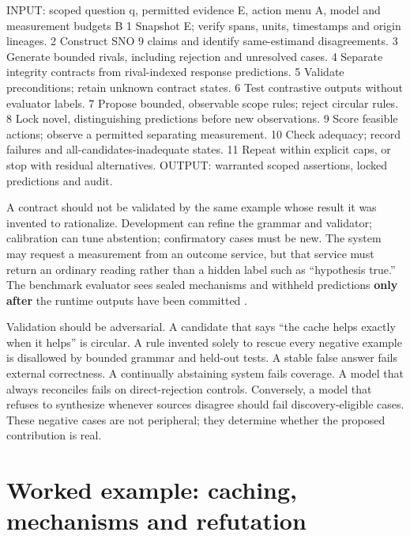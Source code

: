 \documentclass[11pt,a4paper]{article}
\begin{document}
\par\medskip
\noindent\begin{minipage}{\linewidth}
\begin{CNSAlgorithm}
INPUT: scoped question q, permitted evidence E, action menu A,
       model and measurement budgets B
1  Snapshot E; verify spans, units, timestamps and origin lineages.
2  Construct SNO 9 claims and identify same-estimand disagreements.
3  Generate bounded rivals, including rejection and unresolved cases.
4  Separate integrity contracts from rival-indexed response predictions.
5  Validate preconditions; retain unknown contract states.
6  Test contrastive outputs without evaluator labels.
7  Propose bounded, observable scope rules; reject circular rules.
8  Lock novel, distinguishing predictions before new observations.
9  Score feasible actions; observe a permitted separating measurement.
10 Check adequacy; record failures and all-candidates-inadequate states.
11 Repeat within explicit caps, or stop with residual alternatives.
OUTPUT: warranted scoped assertions, locked predictions and audit.
\end{CNSAlgorithm}
\end{minipage}\par\medskip

A contract should not be validated by the same example whose result it
was invented to rationalize. Development can refine the grammar and
validator; calibration can tune abstention; confirmatory cases must be
new. The system may request a measurement from an outcome service, but
that service must return an ordinary reading rather than a hidden label
such as ``hypothesis true.'' The benchmark evaluator sees sealed
mechanisms and withheld predictions \textbf{only after} the runtime
outputs have been committed \citep{G08}.

Validation should be adversarial. A candidate that says ``the cache
helps exactly when it helps'' is circular. A rule invented solely to
rescue every negative example is disallowed by bounded grammar and
held-out tests. A stable false answer fails external correctness. A
continually abstaining system fails coverage. A model that always
reconciles fails on direct-rejection controls. Conversely, a model that
refuses to synthesize whenever sources disagree should fail
discovery-eligible cases. These negative cases are not peripheral; they
determine whether the proposed contribution is real.

\section{Worked example: caching, mechanisms and
refutation}\label{worked-example-caching-mechanisms-and-refutation}
\end{document}
